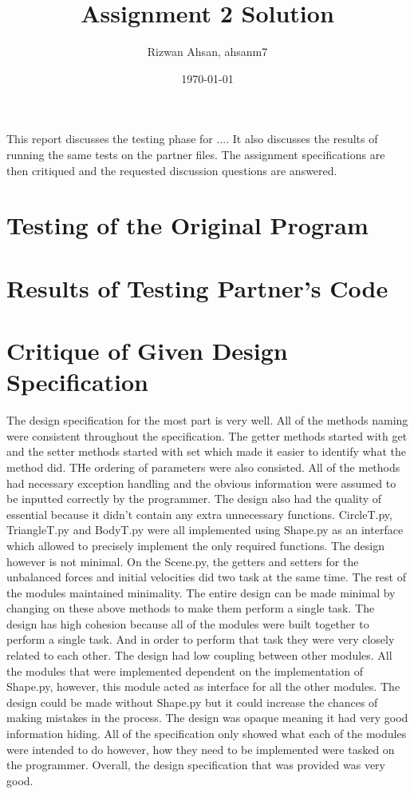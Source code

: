 \documentclass[12pt]{article}
\title{Assignment 2 Solution}
\author{Rizwan Ahsan, ahsanm7}
\date{\today}
\begin{document}
\maketitle

This report discusses the testing phase for .... It also discusses the results
of running the same tests on the partner files. The assignment specifications
are then critiqued and the requested discussion questions are answered.

\section{Testing of the Original Program}


\section{Results of Testing Partner's Code}


\section{Critique of Given Design Specification}
The design specification for the most part is very well. All of the methods naming were consistent throughout the specification. The getter methods started with get and the setter methods started with set which made it easier to identify what the method did. THe ordering of parameters were also consisted. All of the methods had necessary exception handling and the obvious information were assumed to be inputted correctly by the programmer. The design also had the quality of essential because it didn't contain any extra unnecessary functions. CircleT.py, TriangleT.py and BodyT.py were all implemented using Shape.py as an interface which allowed to precisely implement the only required functions. The design however is not minimal. On the Scene.py, the getters and setters for the unbalanced forces and initial velocities did two task at the same time. The rest of the modules maintained minimality. The entire design can be made minimal by changing on these above methods to make them perform a single task. The design has high cohesion because all of the modules were built together to perform a single task. And in order to perform that task they were very closely related to each other. The design had low coupling between other modules. All the modules that were implemented dependent on the implementation of Shape.py, however, this module acted as interface for all the other modules. The design could be made without Shape.py but it could increase the chances of making mistakes in the process. The design was opaque meaning it had very good information hiding. All of the specification only showed what each of the modules were intended to do however, how they need to be implemented were tasked on the programmer. Overall, the design specification that was provided was very good.
\end{document}
